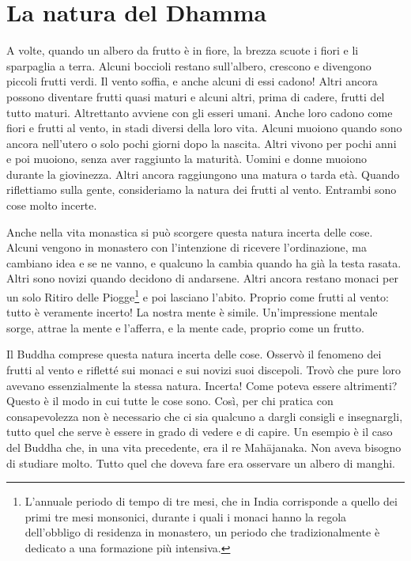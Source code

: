 \chapter{La natura del Dhamma}

A volte, quando un albero da frutto è in fiore, la brezza scuote i fiori
e li sparpaglia a terra. Alcuni boccioli restano sull'albero, crescono e
divengono piccoli frutti verdi. Il vento soffia, e anche alcuni di essi
cadono! Altri ancora possono diventare frutti quasi maturi e alcuni
altri, prima di cadere, frutti del tutto maturi. Altrettanto avviene con
gli esseri umani. Anche loro cadono come fiori e frutti al vento, in
stadi diversi della loro vita. Alcuni muoiono quando sono ancora
nell'utero o solo pochi giorni dopo la nascita. Altri vivono per pochi
anni e poi muoiono, senza aver raggiunto la maturità. Uomini e donne
muoiono durante la giovinezza. Altri ancora raggiungono una matura o
tarda età. Quando riflettiamo sulla gente, consideriamo la natura dei
frutti al vento. Entrambi sono cose molto incerte.

Anche nella vita monastica si può scorgere questa natura incerta delle
cose. Alcuni vengono in monastero con l'intenzione di ricevere
l'ordinazione, ma cambiano idea e se ne vanno, e qualcuno la cambia
quando ha già la testa rasata. Altri sono novizi quando decidono di
andarsene. Altri ancora restano monaci per un solo Ritiro delle
Piogge\footnote{L'annuale periodo di tempo di tre mesi, che in India
  corrisponde a quello dei primi tre mesi monsonici, durante i quali i
  monaci hanno la regola dell'obbligo di residenza in monastero, un
  periodo che tradizionalmente è dedicato a una formazione più
  intensiva.} e poi lasciano l'abito. Proprio come frutti al vento:
tutto è veramente incerto! La nostra mente è simile. Un'impressione
mentale sorge, attrae la mente e l'afferra, e la mente cade, proprio
come un frutto.

Il Buddha comprese questa natura incerta delle cose. Osservò il fenomeno
dei frutti al vento e rifletté sui monaci e sui novizi suoi discepoli.
Trovò che pure loro avevano essenzialmente la stessa natura. Incerta!
Come poteva essere altrimenti? Questo è il modo in cui tutte le cose
sono. Così, per chi pratica con consapevolezza non è necessario che ci
sia qualcuno a dargli consigli e insegnargli, tutto quel che serve è
essere in grado di vedere e di capire. Un esempio è il caso del Buddha
che, in una vita precedente, era il re Mahājanaka. Non aveva bisogno di
studiare molto. Tutto quel che doveva fare era osservare un albero di
manghi.

